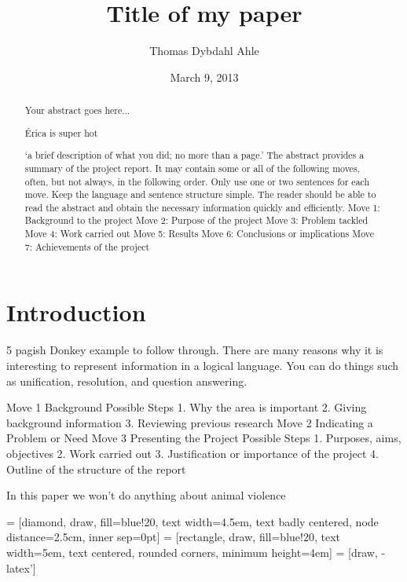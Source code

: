 \documentclass[12pt]{article}
\title{Title of my paper}
\author{Thomas Dybdahl Ahle}
\date{March 9, 2013}
\let\stdsection\section
\renewcommand\section{\newpage\stdsection}
\begin{document}
\maketitle

\begin{abstract}
Your abstract goes here...

Érica is super hot

‘a brief description of what you did; no more than a page.’
The abstract provides a summary of the project report. It may contain some or all of the following moves, 
often, but not always, in the following order. Only use one or two sentences for each move. Keep the 
language and sentence structure simple. The reader should be able to read the abstract and obtain the 
necessary information quickly and efficiently.
Move 1:  Background to the project
Move 2: Purpose of the project
Move 3: Problem tackled
Move 4: Work carried out
Move 5: Results 
Move 6: Conclusions or implications
Move 7: Achievements of the project

\end{abstract}

\tableofcontents


\section{Introduction}
5 pagish Donkey example to follow through. There are many reasons why it is interesting to represent information in a logical language. You can do things such as unification, resolution, and question answering.

Move 1 Background 
Possible Steps 1. Why the area is important
2. Giving background information
3. Reviewing previous research
Move 2 Indicating a Problem or Need
Move 3 Presenting the Project
Possible Steps 1. Purposes, aims, objectives
2. Work carried out
3. Justification or importance of the project
4. Outline of the structure of the report

In this paper we won't do anything about animal violence

 = [diamond, draw, fill=blue!20,
    text width=4.5em, text badly centered, node distance=2.5cm, inner sep=0pt]
 = [rectangle, draw, fill=blue!20,
    text width=5em, text centered, rounded corners, minimum height=4em]
 = [draw, -latex']
    
\end{document}
